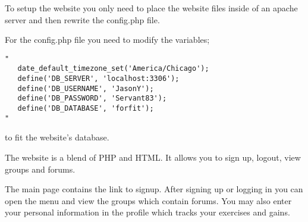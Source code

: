 To setup the website you only need to place the website files inside of an apache server and then rewrite the config.php file.

For the config.php file you need to modify the variables;

\begin{verbatim}
"
   date_default_timezone_set('America/Chicago');
   define('DB_SERVER', 'localhost:3306');
   define('DB_USERNAME', 'JasonY');
   define('DB_PASSWORD', 'Servant83');
   define('DB_DATABASE', 'forfit');
"
\end{verbatim}

to fit the website's database.

The website is a blend of PHP and HTML. It allows you to sign up, logout, view groups and forums.

The main page contains the link to signup. After signing up or logging in you can open the menu and view the groups which contain forums. You may also enter your personal information in the profile which tracks your exercises and gains.